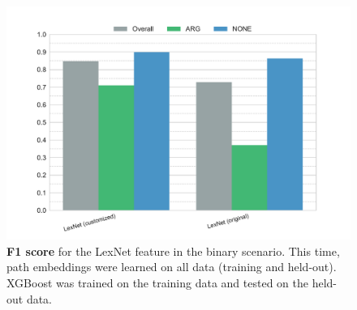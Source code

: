     
\begin{figure}[htbp]
         \caption{\textbf{F1 score} for the LexNet feature in the binary scenario. This time, path embeddings were learned on all data (training and held-out). XGBoost was trained on the training data and tested on the held-out data.} 
    \label{fig:jl_2_f1}
    \centering
	\includegraphics[width=1\linewidth]{images/extra/jl-f1-True}
    \end{figure}
